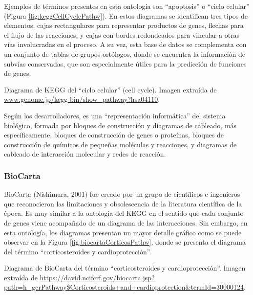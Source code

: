 \documentclass[12pt,twoside]{reedthesis}
\begin{document}
\par

Ejemplos de términos presentes en esta ontología son ``apoptosis'' o ``ciclo celular'' (Figura \ref{fig:keggCellCyclePathw}). En estos diagramas se identifican tres tipos de elementos: cajas rectangulares para representar productos de genes, flechas para el flujo de las reacciones, y cajas con bordes redondeados para vincular a otras vías involucradas en el proceso. A su vez, esta base de datos se complementa con un conjunto de tablas de grupos ortólogos, donde se encuentra la información de subvías conservadas, que son especialmente útiles para la predicción de funciones de genes.

Diagrama de KEGG del ``ciclo celular'' (cell cycle). Imagen extraída de \url{www.genome.jp/kegg-bin/show_pathway?hsa04110}.



\par

Según los desarrolladores, es una ``representación informática'' del sistema biológico, formada por bloques de construcción y diagramas de cableado, más específicamente, bloques de construcción de genes o proteínas, bloques de construcción de químicos de pequeñas moléculas y reacciones, y diagramas de cableado de interacción molecular y redes de reacción.

\hypertarget{biocarta}{%
\subsubsection{BioCarta}\label{biocarta}}

BioCarta (Nishimura, 2001) fue creado por un grupo de científicos e ingenieros que reconocieron las limitaciones y obsolescencia de la literatura científica de la época. Es muy similar a la ontología del KEGG en el sentido que cada conjunto de genes viene acompañado de un diagrama de las interacciones. Sin embargo, en esta ontología, los diagramas presentan un mayor detalle gráfico como se puede observar en la Figura \ref{fig:biocartaCorticosPathw}, donde se presenta el diagrama del término ``corticosteroides y cardioprotección''.

Diagrama de BioCarta del término ``corticosteroides y cardioprotección''. Imagen extraída de \url{https://david.ncifcrf.gov/biocarta.jsp?path=h_gcrPathway$Corticosteroids+and+cardioprotection\&termId=30000124}.



\par
\end{document}
